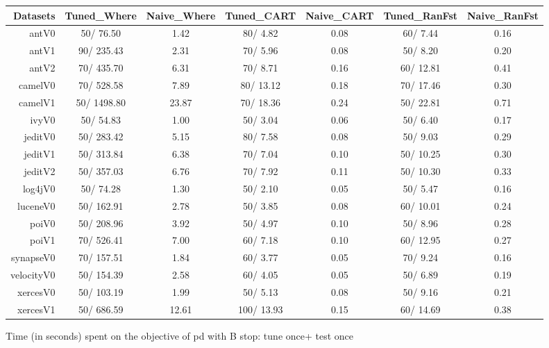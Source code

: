 \documentclass{acm_proc_article-sp}
\begin{document}
\clearpage
\begin{figure*}[!ht]
\scriptsize
\centering
  \begin{tabular}{r|c |c |c |c |c |c }
    \hline\hline
    Datasets & Tuned\_Where & Naive\_Where & Tuned\_CART & Naive\_CART & Tuned\_RanFst & Naive\_RanFst\\
    \hline
    antV0 & 50/ 76.50 & 1.42 & 80/ 4.82 & 0.08 & 60/ 7.44 & 0.16\\
    antV1 & 90/ 235.43 & 2.31 & 70/ 5.96 & 0.08 & 50/ 8.20 & 0.20\\
    antV2 & 70/ 435.70 & 6.31 & 70/ 8.71 & 0.16 & 60/ 12.81 & 0.41\\
    camelV0 & 70/ 528.58 & 7.89 & 80/ 13.12 & 0.18 & 70/ 17.46 & 0.30\\
    camelV1 & 50/ 1498.80 & 23.87 & 70/ 18.36 & 0.24 & 50/ 22.81 & 0.71\\
    ivyV0 & 50/ 54.83 & 1.00 & 50/ 3.04 & 0.06 & 50/ 6.40 & 0.17\\
    jeditV0 & 50/ 283.42 & 5.15 & 80/ 7.58 & 0.08 & 50/ 9.03 & 0.29\\
    jeditV1 & 50/ 313.84 & 6.38 & 70/ 7.04 & 0.10 & 50/ 10.25 & 0.30\\
    jeditV2 & 50/ 357.03 & 6.76 & 70/ 7.92 & 0.11 & 50/ 10.30 & 0.33\\
    log4jV0 & 50/ 74.28 & 1.30 & 50/ 2.10 & 0.05 & 50/ 5.47 & 0.16\\
    luceneV0 & 50/ 162.91 & 2.78 & 50/ 3.85 & 0.08 & 60/ 10.01 & 0.24\\
    poiV0 & 50/ 208.96 & 3.92 & 50/ 4.97 & 0.10 & 50/ 8.96 & 0.28\\
    poiV1 & 70/ 526.41 & 7.00 & 60/ 7.18 & 0.10 & 60/ 12.95 & 0.27\\
    synapseV0 & 70/ 157.51 & 1.84 & 60/ 3.77 & 0.05 & 70/ 9.24 & 0.16\\
    velocityV0 & 50/ 154.39 & 2.58 & 60/ 4.05 & 0.05 & 50/ 6.89 & 0.19\\
    xercesV0 & 50/ 103.19 & 1.99 & 50/ 5.13 & 0.08 & 50/ 9.16 & 0.21\\
    xercesV1 & 50/ 686.59 & 12.61 & 100/ 13.93 & 0.15 & 60/ 14.69 & 0.38\\
  \end{tabular}
  \caption{Time (in seconds) spent on the objective of pd with B stop: tune once+ test once}
\end{figure*}
\end{document}
